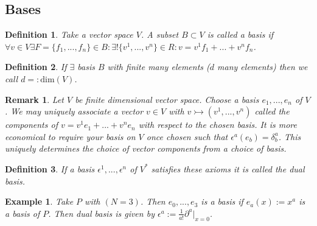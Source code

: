 \documentclass[10pt, oneside]{article}
\newtheorem{defn}{Definition}
\newtheorem{example}{Example}
\newtheorem{remark}{Remark}
\begin{document}
     \subsection{Bases}
        \begin{defn}
           Take a vector space $V$. A subset $B \subset V$ is called a basis if $\forall v \in V \exists F=\{f_1, ..., f_n\} \in B : \exists ! \{v^1, ..., v^n\} \in R : v = v^1 f_1 + ... + v^n f_n$.
        \end{defn}
        \begin{defn}
           If $\exists$ basis $B$ with finite many elements ($d$ many elements) then we call $d =: \text{dim}(V)$.
        \end{defn}
        \begin{remark}
           Let $V$ be finite dimensional vector space. Choose a basis $e_1, ..., e_n$ of $V$. We may uniquely associate a vector $v \in V$ with $v \rightarrowtail (v^1,...,v^n)$ called the components of $v=v^1e_1+...+v^ne_n$ with respect to the chosen basis.
           It is more economical to require your basis on $V$ once chosen such that $\epsilon^a (e_b) = \delta^a_b$. This uniquely determines the choice of vector components from a choice of basis.
        \end{remark}
        \begin{defn}
           If a basis $\epsilon^1,...,\epsilon^n$ of $V^*$ satisfies these axioms it is called the dual basis.
        \end{defn}
        \begin{example}
           Take $P$ with $(N=3)$. Then $e_0,...,e_3$ is a basis if $e_a (x) := x^a$ is a basis of $P$. Then dual basis is given by $\epsilon^a := \frac{1}{a!} \partial^a |_{x=0}$.
        \end{example}
\end{document}

